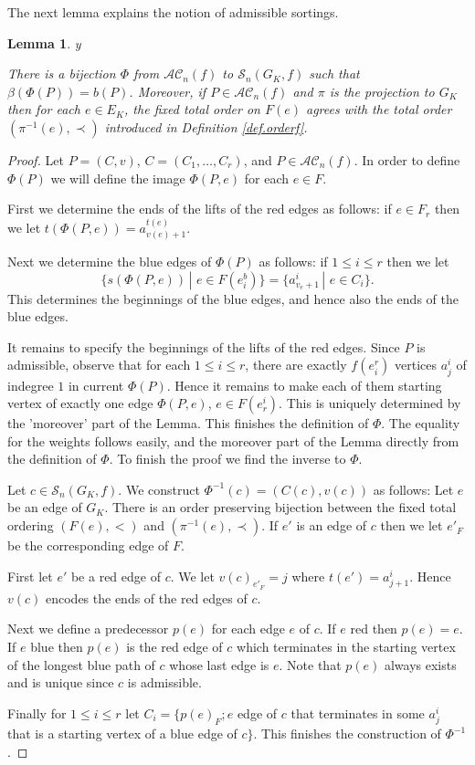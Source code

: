 \documentclass{amsart}
\theoremstyle{plain}
\newtheorem{lemma}[proposition]{Lemma}
\theoremstyle{definition}
\theoremstyle{remark}
\def\printname#1{
        \if\draft y
                \smash{\makebox[0pt]{\hspace{-0.5in}
                        \raisebox{8pt}{\tt\tiny #1}}}
        \fi
}
\def\lbl#1{\label{#1}\printname{#1}}
\def\AC{\mathcal{AC}}
\def\b{\beta}
\def\Sev{{\mathcal S}}
\begin{document}
The next lemma explains the notion of admissible sortings.

\begin{lemma}
\lbl{lem.ACconf}
There is a bijection $\Phi$ from $\AC_n(f)$ to $\Sev_n(G_K, f)$
such that $\b(\Phi(P))= b(P)$.
Moreover, if $P\in \AC_n(f)$  and $\pi$ is the projection to  $G_K$ 
then for each $e\in E_K$, the fixed total order on $F(e)$ agrees 
with the total order $(\pi^{-1}(e), \prec)$ introduced in Definition 
\ref{def.orderf}.
\end{lemma}

\begin{proof}
Let $P=(C,v)$, $C=(C_1,\dots, C_{r})$, and $P\in \AC_n(f)$.
In order to define
$\Phi(P)$ we will define the image $\Phi(P,e)$ for each $e\in F$.

First we  determine the ends of  the lifts of the red edges
as follows: if $e\in F_r$ then we let $t(\Phi(P,e))= a^{t(e)}_{v(e)+1}$.

Next we determine the blue edges of $\Phi(P)$ as follows:
if $1\leq i \leq r$ then we let 
$$
\{s(\Phi(P,e))\, |\,\, e\in F(e^b_i)\}= \{a^i_{v_e+1}\, | \,\, e\in C_i\}.
$$
This determines the beginnings of the  blue edges,
and hence also the ends of the blue edges.

 It remains to specify the beginnings of the lifts of the red edges. 
Since $P$ is admissible, observe that for each $1\leq i\leq r$, 
there are exactly $f(e^r_i)$ vertices $a^i_j$ of indegree $1$ in current
$\Phi(P)$. Hence it remains to make each of them starting vertex of exactly
one edge $\Phi(P,e)$, $e\in F(e^i_r)$. This
is uniquely determined by the 'moreover' part of the Lemma. 
This finishes the definition of $\Phi$. The equality for the weights 
follows easily, and the moreover part of the Lemma directly from the 
definition of $\Phi$. To finish the proof we find the inverse to $\Phi$.

Let $c\in \Sev_n(G_K, f)$. We construct $\Phi^{-1}(c)=(C(c), v(c))$ as follows:
 Let $e$ be an edge of $G_K$. There is an order preserving bijection between 
the 
fixed total ordering $(F(e),<)$ and  $(\pi^{-1}(e), \prec)$. If $e'$ is an 
edge 
of $c$ then we let $e'_F$ be the corresponding edge of $F$.

First let $e'$ be a red edge of $c$. We let $v(c)_{e'_F}= j$ where 
$t(e')=a^i_{j+1}$.
Hence $v(c)$ encodes the ends of the red edges of $c$.

Next we  define a predecessor $p(e)$ for each edge $e$ of $c$. 
If $e$ red then $p(e)=e$. If $e$ blue then $p(e)$ is the red edge of $c$ 
which terminates in the starting vertex of the longest blue path of $c$ 
whose last edge is $e$. Note that $p(e)$ always exists and is unique
since $c$ is admissible.

Finally for $1\leq i \leq r$ let $C_i=\{p(e)_F; e$ edge of $c$ that 
terminates in 
some $a^i_j$ that is a starting vertex of a blue edge of $c \}$.
This finishes the construction of $\Phi^{-1}$. 
\end{proof}
\end{document}

